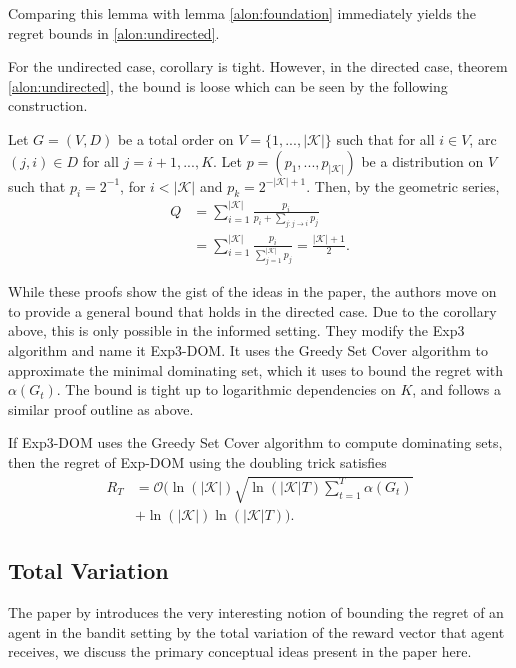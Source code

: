 Comparing this lemma with lemma \ref{alon:foundation} immediately yields the regret bounds in \ref{alon:undirected}.

For the undirected case, corollary \label{alon:corollary} is tight. However, in the directed case, theorem \ref{alon:undirected}, the bound is loose which can be seen by the following construction. 

\begin{corollary}
	Let $G=(V,D)$ be a total order on $V=\{1,...,|\mathcal{K}|\}$ such that for all $i\in V$, arc $(j,i)\in D$ for all $j=i+1,...,K$. Let $p=(p_1,...,p_{|\mathcal{K}|})$ be a distribution on $V$ such that $p_i=2^{-1}$, for $i< |\mathcal{K}|$ and $p_k=2^{-|\mathcal{K}|+1}$. Then, by the geometric series,
	\begin{align*}
		Q&=\sum_{i=1}^{|\mathcal{K}|}\frac{p_i}{p_i+\sum_{j:j\to i}p_j}\\
		 &=\sum_{i=1}^{|\mathcal{K}|}\frac{p_i}{\sum_{j=1}^{|\mathcal{K}|}p_j}=\frac{|\mathcal{K}|+1}{2}.
	\end{align*}
\end{corollary} 

While these proofs show the gist of the ideas in the paper, the authors move on to provide a general bound that holds in the directed case. Due to the corollary above, this is only possible in the informed setting. They modify the Exp3 algorithm and name it Exp3-DOM. It uses the Greedy Set Cover algorithm to approximate the minimal dominating set, which it uses to bound the regret with $\alpha(G_t)$. The bound is tight up to logarithmic dependencies on $K$, and follows a similar proof outline as above. 

\begin{theorem}
	If Exp3-DOM uses the Greedy Set Cover algorithm to compute dominating sets, then the regret of Exp-DOM using the doubling trick satisfies
	\begin{align*}
		R_T&=\mathcal{O}\bigg(\ln(|\mathcal{K}|)\sqrt{\ln(|\mathcal{K}| T)\sum_{t=1}^T\alpha(G_t)}\\
		&+\ln(|\mathcal{K}|)\ln(|\mathcal{K}|T)\bigg).
	\end{align*}
\end{theorem}


\subsection{Total Variation}
The paper by \citep{hazan} introduces the very interesting notion of bounding
the regret of an agent in the bandit setting by the total variation of the reward vector 
that agent receives, we discuss the primary conceptual ideas present in the paper here. \\

